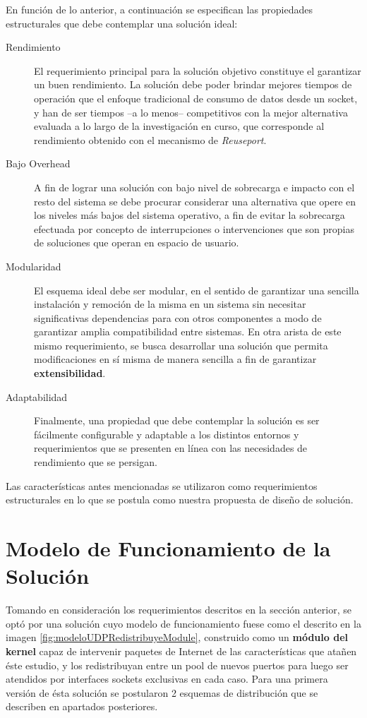 En función de lo anterior, a continuación se especifican las propiedades estructurales que debe contemplar una solución ideal:

\begin{description}
\item[Rendimiento] El requerimiento principal para la solución objetivo constituye el garantizar un buen rendimiento. La solución debe poder brindar mejores tiempos de operación que el enfoque tradicional de consumo de datos desde un socket, y han de ser tiempos --a lo menos-- competitivos con la mejor alternativa evaluada a lo largo de la investigación en curso, que corresponde al rendimiento obtenido con el mecanismo de \emph{Reuseport}.
\item[Bajo Overhead] A fin de lograr una solución con bajo  nivel de sobrecarga e impacto con el resto del sistema se debe procurar considerar una alternativa que opere en los niveles más bajos del sistema operativo, a fin de evitar la sobrecarga efectuada por concepto de interrupciones o intervenciones que son propias de soluciones que operan en espacio de usuario.
\item[Modularidad] El esquema ideal debe ser modular, en el sentido de garantizar una sencilla instalación y remoción de la misma en un sistema sin necesitar significativas dependencias para con otros componentes a modo de garantizar amplia compatibilidad entre sistemas. En otra arista de este mismo requerimiento, se busca desarrollar una solución que permita modificaciones en sí misma de manera sencilla a fin de garantizar \textbf{extensibilidad}.
\item[Adaptabilidad] Finalmente, una propiedad que debe contemplar la solución es ser fácilmente configurable y adaptable a los distintos entornos y requerimientos que se presenten en línea con las necesidades de rendimiento que se persigan.
\end{description}

Las características antes mencionadas se utilizaron como requerimientos estructurales en lo que se postula como nuestra propuesta de diseño de solución.

\section{Modelo de Funcionamiento de la Solución}
Tomando en consideración los requerimientos descritos en la sección anterior, se optó por una solución cuyo modelo de funcionamiento fuese como el descrito en la imagen \ref{fig:modeloUDPRedistribuyeModule}, construido como un \textbf{módulo del kernel} capaz de intervenir paquetes de Internet de las características que atañen éste estudio, y los redistribuyan entre un pool de nuevos puertos para luego ser atendidos por interfaces sockets exclusivas en cada caso. Para una primera versión de ésta solución se postularon 2 esquemas de distribución que se describen en apartados posteriores.

